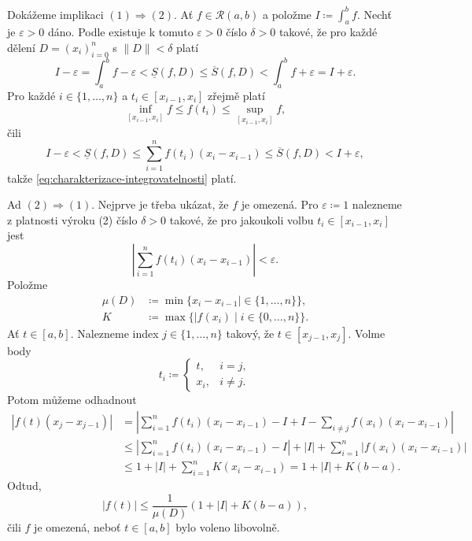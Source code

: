 \begin{lemproof}
 Dokážeme implikaci $(1) \Rightarrow (2)$. Ať $f \in \mathcal{R}(a,b)$ a položme
 $I \coloneqq \int_{a}^{b} f$. Nechť je $\varepsilon>0$ dáno. Podle
  existuje k tomuto
 $\varepsilon>0$ číslo $\delta>0$ takové, že pro každé dělení $D =
 (x_i)_{i=0}^{n}$ s
 $\|D\|<\delta$ platí
 \[
  I - \varepsilon = \int_{a}^{b} f - \varepsilon < \underline{S}(f,D) \leq
  \overline{S}(f,D) < \int_{a}^{b} f + \varepsilon = I +\varepsilon.
 \]
 Pro každé $i \in \{1,\ldots,n\}$ a $t_i \in [x_{i-1},x_i]$ zřejmě platí
 \[
  \inf_{[x_{i-1},x_i]} f \leq f(t_i) \leq \sup_{[x_{i-1},x_i]}f,
 \]
 čili
 \[
  I - \varepsilon < \underline{S}(f,D) \leq \sum_{i = 1}^{n} f(t_i)(x_i -
  x_{i-1}) \leq \overline{S}(f,D) < I + \varepsilon,
 \]
 takže \eqref{eq:charakterizace-integrovatelnosti} platí.

 Ad $(2) \Rightarrow (1)$. Nejprve je třeba ukázat, že $f$ je omezená. Pro
 $\varepsilon \coloneqq 1$ nalezneme z platnosti výroku (2) číslo $\delta>0$
 takové, že pro jakoukoli volbu $t_i \in [x_{i-1},x_i]$ jest
 \[
  \left| \sum_{i = 1}^{n} f(t_i)(x_i - x_{i-1}) \right|<\varepsilon.
 \]
 Položme
 \begin{align*}
  \mu(D) &\coloneqq \min \{x_i - x_{i-1} \mid \in \{1,\ldots,n\}\},\\
  K & \coloneqq \max \{|f(x_i) \mid i \in \{0,\ldots,n\}\}.
 \end{align*}
 Ať $t \in [a,b]$. Nalezneme index $j \in \{1,\ldots,n\}$ takový, že $t \in
 [x_{j-1},x_j]$. Volme body
 \[
  t_i \coloneqq \begin{cases}
   t,& i = j,\\
   x_i,& i \neq j.
  \end{cases}
 \]
 Potom můžeme odhadnout
 \begin{align*}
  |f(t)(x_j - x_{j-1})| &= \left| \sum_{i = 1}^{n} f(t_i)(x_i - x_{i-1}) - I + I
  - \sum_{i \neq j} f(x_i)(x_i - x_{i-1}) \right| \\
  & \leq \left| \sum_{i = 1}^{n} f(t_i)(x_i - x_{i-1}) - I \right| + |I| +
  \sum_{i = 1}^{n} |f(x_i)(x_i - x_{i-1})| \\
  & \leq 1 + |I| + \sum_{i=1}^{n} K(x_i - x_{i-1}) = 1 + |I| + K(b-a).
 \end{align*}
 Odtud,
 \[
  |f(t)| \leq \frac{1}{\mu(D)}(1 + |I| + K(b-a)),
 \]
 čili $f$ je omezená, neboť $t \in [a,b]$ bylo voleno libovolně.


\end{lemproof}
